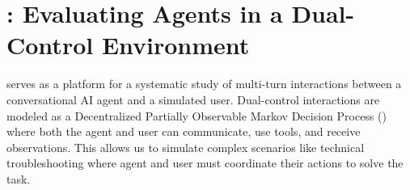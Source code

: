 \section{\bench: Evaluating Agents in a Dual-Control Environment}
\label{sec:methods}

\bench serves as a platform for a systematic study of multi-turn interactions between a conversational AI agent and a simulated user. %
Dual-control interactions are modeled as a Decentralized Partially Observable Markov Decision Process (\decpomdp)~\cite{oliehoek2016concise} where both the agent and user can communicate, use tools, and receive observations. This allows us to simulate complex scenarios like technical troubleshooting where agent and user must coordinate their actions to solve the task.


